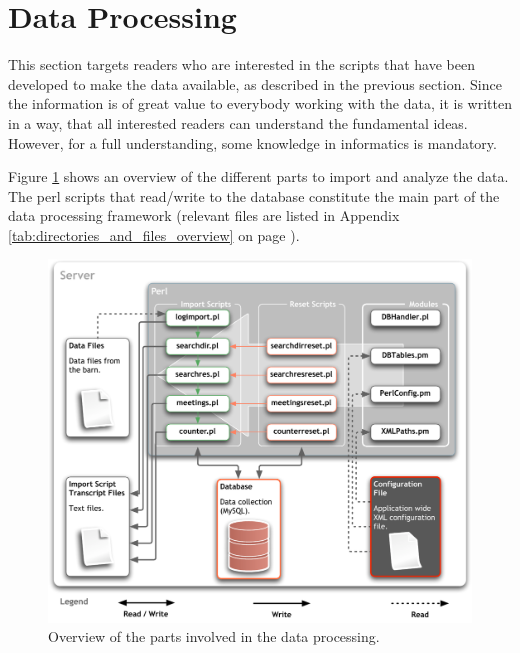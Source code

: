 \newpage
\section{Data Processing}
\label{sec:dataproc}

This section targets readers who are interested in the scripts that have been developed to make the data available, as described in the previous section. Since the information is of great value to everybody working with the data, it is written in a way, that all interested readers can understand the fundamental ideas. However, for a full understanding, some knowledge in informatics is mandatory.

Figure \ref{fig:app_design_perl} shows an overview of the different parts to import and analyze the data. The \ac{perl} scripts that read/write to the database constitute the main part of the
data processing framework (relevant files are listed in Appendix \ref{tab:directories_and_files_overview} on page \pageref{tab:directories_and_files_overview}). 

\begin{figure}[htpb]
\begin{center}
  \includegraphics[width=\textwidth]{assets/pdf/app_design_perl.pdf}
  \caption[Data processing overview]{Overview of the parts involved in the data processing.}
  \label{fig:app_design_perl}
\end{center}
\end{figure}

